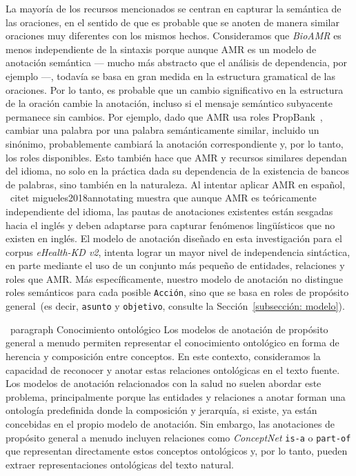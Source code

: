 La mayoría de los recursos mencionados se centran en capturar la semántica de las oraciones, en el sentido de que es probable que se anoten de manera similar oraciones muy diferentes con los mismos hechos. Consideramos que \textit{BioAMR} es menos independiente de la sintaxis porque aunque AMR es un modelo de anotación semántica --- mucho más abstracto que el análisis de dependencia, por ejemplo ---, todavía se basa en gran medida en la estructura gramatical de las oraciones. Por lo tanto, es probable que un cambio significativo en la estructura de la oración cambie la anotación, incluso si el mensaje semántico subyacente permanece sin cambios. Por ejemplo, dado que AMR usa roles PropBank~\cite{propbank}, cambiar una palabra por una palabra semánticamente similar, incluido un sinónimo, probablemente cambiará la anotación correspondiente y, por lo tanto, los roles disponibles.
Esto también hace que AMR y recursos similares dependan del idioma, no solo en la práctica dada su dependencia de la existencia de bancos de palabras, sino también en la naturaleza. Al intentar aplicar AMR en español, \ citet {migueles2018annotating} muestra que aunque AMR es teóricamente independiente del idioma, las pautas de anotaciones existentes están sesgadas hacia el inglés y deben adaptarse para capturar fenómenos lingüísticos que no existen en inglés.
El modelo de anotación diseñado en esta investigación para el corpus \textit{eHealth-KD v2}, intenta lograr un mayor nivel de independencia sintáctica, en parte mediante el uso de un conjunto más pequeño de entidades, relaciones y roles que AMR. Más específicamente, nuestro modelo de anotación no distingue roles semánticos para cada posible \texttt{Acción}, sino que se basa en roles de propósito general~(es decir, \texttt{asunto} y \texttt{objetivo}, consulte la Sección~\ref{subsección: modelo}).

\ paragraph {Conocimiento ontológico}
Los modelos de anotación de propósito general a menudo permiten representar el conocimiento ontológico en forma de herencia y composición entre conceptos. En este contexto, consideramos la capacidad de reconocer y anotar estas relaciones ontológicas en el texto fuente. Los modelos de anotación relacionados con la salud no suelen abordar este problema, principalmente porque las entidades y relaciones a anotar forman una ontología predefinida donde la composición y jerarquía, si existe, ya están concebidas en el propio modelo de anotación. Sin embargo, las anotaciones de propósito general a menudo incluyen relaciones como \textit{ConceptNet} \texttt{is-a} o \texttt{part-of} que representan directamente estos conceptos ontológicos y, por lo tanto, pueden extraer representaciones ontológicas del texto natural.

